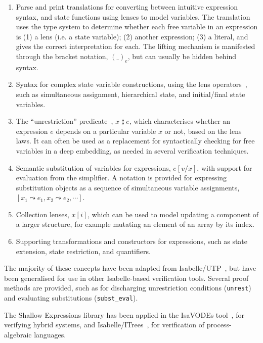 \documentclass[11pt,a4paper]{article}
\begin{document}
\begin{enumerate}
  \item Parse and print translations for converting between intuitive expression syntax,
    and state functions using lenses to model variables. The translation uses the type
    system to determine whether each free variable in an expression is (1) a lens (i.e. a state 
    variable); (2) another expression; (3) a literal, and gives the correct interpretation for each.
    The lifting mechanism is manifested through the bracket notation, $(\_)_e$, but can usually be hidden behind syntax.
  \item Syntax for complex state variable constructions, using the lens operators~\cite{Optics-AFP}, such as simultaneous 
    assignment, hierarchical state, and initial/final state variables.
  \item The ``unrestriction'' predicate~\cite{Oliveira07,Foster2020-IsabelleUTP}, $x \mathop{\sharp} e$, 
    which characterises whether an expression $e$ depends on a
    particular variable $x$ or not, based on the lens laws. It can often be used as a replacement for 
    syntactically checking for free variables in a deep embedding, as needed in several verification
    techniques.
  \item Semantic substitution of variables for expressions, $e[v/x]$, with support for evaluation from 
    the simplifier. A notation is provided for expressing substitution objects as a sequence of simultaneous 
    variable assignments, $[x_1 \leadsto e_1, x_2 \leadsto e_2, \cdots]$.
  \item Collection lenses, $x[i]$, which can be used to model updating a component of a larger structure,
    for example mutating an element of an array by its index.
  \item Supporting transformations and constructors for expressions, such as state extension, 
    state restriction, and quantifiers.
\end{enumerate}

The majority of these concepts have been adapted from Isabelle/UTP~\cite{Foster2020-IsabelleUTP}, but 
have been generalised for use in other Isabelle-based verification tools. Several proof methods are 
provided, such as for discharging unrestriction conditions (\texttt{unrest}) and evaluating substitutions (\texttt{subst\_eval}).

The Shallow Expressions library has been applied in the IsaVODEs tool~\cite{Munive2024IsaVODES}, for 
verifying hybrid systems, and Isabelle/ITrees~\cite{Foster2024ITrees}, for verification of process-algebraic languages. 





\end{document}
